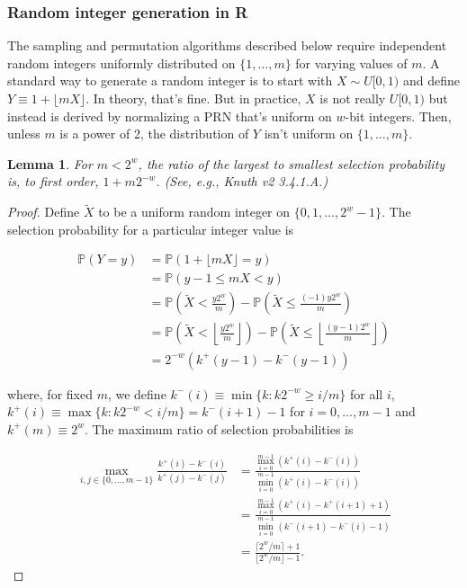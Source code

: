 \documentclass[12pt]{article}
\newtheorem{lemma}[theorem]{Lemma}
\newcommand{\todo}[1]{{\color{red}{TO DO: \sc #1}}}
\newcommand{\pr}{\mathbb{P}} %
\begin{document}
\subsubsection{Random integer generation in R}
The sampling and permutation algorithms described below require independent random integers
uniformly distributed on $\{1, \dots, m\}$ for varying values of $m$.
A standard way to generate a random integer is to start with $X \sim U[0,1)$ and define $Y \equiv 1 + \lfloor mX \rfloor$. 
In theory, that's fine. 
But in practice, $X$ is not really $U[0,1)$ but instead is derived by normalizing a PRN that's uniform on $w$-bit integers. 
Then, unless $m$ is a power of 2, the distribution of $Y$ isn't uniform on $\{1, \ldots, m\}$. 

\begin{lemma}
For $m < 2^w$, the ratio of the largest to smallest selection probability is, to first order,  $1+ m 2^{-w}$. (See, e.g., Knuth v2 3.4.1.A.)
\end{lemma}

\begin{proof}
Define $\tilde{X}$ to be a uniform random integer on $\{0, 1, \dots, 2^w - 1\}$.
The selection probability for a particular integer value is 

\begin{align*}
\pr\left(Y = y\right) &= \pr\left(1 + \lfloor mX \rfloor = y\right) \\
&= \pr\left(y-1 \leq mX < y\right) \\
&= \pr\left(\tilde{X} < \frac{y2^w}{m}\right) - \pr\left(\tilde{X} \leq \frac{(-1)y2^w}{m}\right)\\
&= \pr\left(\tilde{X} < \left\lfloor\frac{y2^w}{m}\right\rfloor\right) - \pr\left(\tilde{X} \leq \left\lfloor\frac{(y-1)2^w}{m}\right\rfloor\right)\\
&= 2^{-w}\left(k^+(y-1)- k^-(y-1)\right)
\end{align*}

\noindent where, for fixed $m$, we define $k^-(i) \equiv \min \{k: k2^{-w} \geq i/m\}$ for all $i$,
$k^+(i) \equiv \max \{k : k2^{-w} < i/m \} = k^-(i+1)-1$ for $i = 0, \dots, m-1$
and $k^+(m) \equiv 2^w$.
The maximum ratio of selection probabilities is 

\begin{align*}
\max_{i, j \in \{0, \ldots, m-1\}} \frac{k^+(i) - k^-(i)}{k^+(j) - k^-(j)}
&= \frac{ \max_{i=0}^{m-1} (k^+(i) - k^-(i))}{\min_{i=0}^{m-1} (k^+(i) - k^-(i))} \\
&= \frac{ \max_{i=0}^{m-1} (k^+(i) - k^+(i+1) + 1)}{\min_{i=0}^{m-1} (k^-(i+1) - k^-(i) - 1)} \\
&= \frac{\lceil 2^w/m \rceil + 1}{\lfloor 2^w/m \rfloor -1}.
\end{align*}
\end{proof}
\todo{is this proof right? seems wrong}
\end{document}
